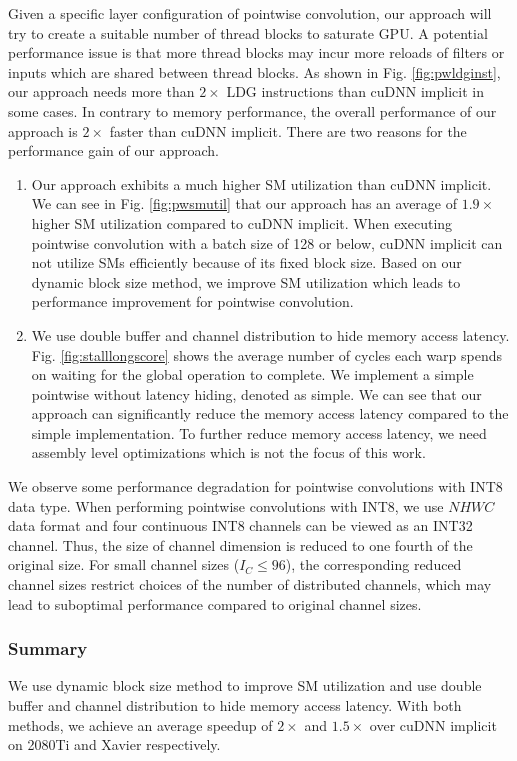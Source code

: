 Given a specific layer configuration of pointwise convolution, our approach will try to create a suitable number of thread blocks to saturate GPU.
A potential performance issue is that more thread blocks may incur more reloads of filters or inputs which are shared between thread blocks.
As shown in Fig. \ref{fig:pwldginst}, our approach needs more than $2\times$ LDG instructions than cuDNN implicit in some cases.
In contrary to memory performance, the overall performance of our approach is $2\times$ faster than cuDNN implicit.
There are two reasons for the performance gain of our approach.
\begin{enumerate}
	\item Our approach exhibits a much higher SM utilization than cuDNN implicit.
	We can see in Fig. \ref{fig:pwsmutil} that our approach has an average of $1.9\times$ higher SM utilization compared to cuDNN implicit.
	When executing pointwise convolution with a batch size of 128 or below, cuDNN implicit can not utilize SMs efficiently because of its fixed block size.
	Based on our dynamic block size method, we improve SM utilization which leads to performance improvement for pointwise convolution.
	\item We use double buffer and channel distribution to hide memory access latency.
	Fig. \ref{fig:stalllongscore} shows the average number of cycles each warp spends on waiting for the global operation to complete.
	We implement a simple pointwise without latency hiding, denoted as simple.
	We can see that our approach can significantly reduce the memory access latency compared to the simple implementation.
	To further reduce memory access latency, we need assembly level optimizations which is not the focus of this work.
\end{enumerate}

We observe some performance degradation for pointwise convolutions with INT8 data type.
When performing pointwise convolutions with INT8, we use $NHWC$ data format and four continuous INT8 channels can be viewed as an INT32 channel.
Thus, the size of channel dimension is reduced to one fourth of the original size.
For small channel sizes ($I_C \leq 96$), the corresponding reduced channel sizes restrict  choices of the number of distributed channels, which may lead to suboptimal performance compared to original channel sizes.

\subsubsection{Summary} We use dynamic block size method to improve SM utilization and use double buffer and channel distribution to hide memory access latency. With both methods, we achieve an average speedup of $2\times$ and $1.5\times$ over cuDNN implicit on 2080Ti and Xavier respectively.


